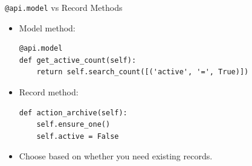 \begin{frame}[fragile]{\texttt{@api.model} vs Record Methods}
	\begin{itemize}
		\item Model method:
\begin{lstlisting}
@api.model
def get_active_count(self):
	return self.search_count([('active', '=', True)])
\end{lstlisting}
		\item Record method:
\begin{lstlisting}
def action_archive(self):
	self.ensure_one()
	self.active = False
\end{lstlisting}
		\item Choose based on whether you need existing records.
	\end{itemize}
\end{frame}
